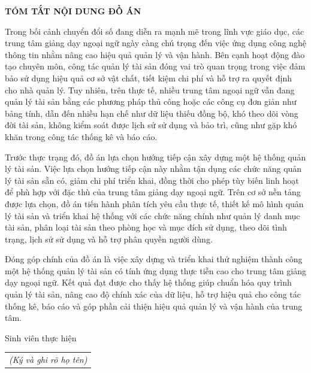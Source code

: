 \documentclass[../DoAn.tex]{subfiles}
\begin{document}
\begin{center}
    \Large{\textbf{TÓM TẮT NỘI DUNG ĐỒ ÁN}}\\
\end{center}
\vspace{1cm}

Trong bối cảnh chuyển đổi số đang diễn ra mạnh mẽ trong lĩnh vực giáo dục, các trung tâm giảng dạy ngoại ngữ ngày càng chú trọng đến việc ứng dụng công nghệ thông tin nhằm nâng cao hiệu quả quản lý và vận hành. Bên cạnh hoạt động đào tạo chuyên môn, công tác quản lý tài sản đóng vai trò quan trọng trong việc đảm bảo sử dụng hiệu quả cơ sở vật chất, tiết kiệm chi phí và hỗ trợ ra quyết định cho nhà quản lý. Tuy nhiên, trên thực tế, nhiều trung tâm ngoại ngữ vẫn đang quản lý tài sản bằng các phương pháp thủ công hoặc các công cụ đơn giản như bảng tính, dẫn đến nhiều hạn chế như dữ liệu thiếu đồng bộ, khó theo dõi vòng đời tài sản, không kiểm soát được lịch sử sử dụng và bảo trì, cũng như gặp khó khăn trong công tác thống kê và báo cáo.

Trước thực trạng đó, đồ án lựa chọn hướng tiếp cận xây dựng một hệ thống quản lý tài sản. Việc lựa chọn hướng tiếp cận này nhằm tận dụng các chức năng quản lý tài sản sẵn có, giảm chi phí triển khai, đồng thời cho phép tùy biến linh hoạt để phù hợp với đặc thù của trung tâm giảng dạy ngoại ngữ. Trên cơ sở nền tảng được lựa chọn, đồ án tiến hành phân tích yêu cầu thực tế, thiết kế mô hình quản lý tài sản và triển khai hệ thống với các chức năng chính như quản lý danh mục tài sản, phân loại tài sản theo phòng học và mục đích sử dụng, theo dõi tình trạng, lịch sử sử dụng và hỗ trợ phân quyền người dùng.

Đóng góp chính của đồ án là việc xây dựng và triển khai thử nghiệm thành công một hệ thống quản lý tài sản có tính ứng dụng thực tiễn cao cho trung tâm giảng dạy ngoại ngữ. Kết quả đạt được cho thấy hệ thống giúp chuẩn hóa quy trình quản lý tài sản, nâng cao độ chính xác của dữ liệu, hỗ trợ hiệu quả cho công tác thống kê, báo cáo và góp phần cải thiện hiệu quả quản lý và vận hành của trung tâm.

\begin{flushright}
Sinh viên thực hiện\\
\begin{tabular}{@{}c@{}}
\textit{(Ký và ghi rõ họ tên)}
\end{tabular}
\end{flushright}
\end{document}
